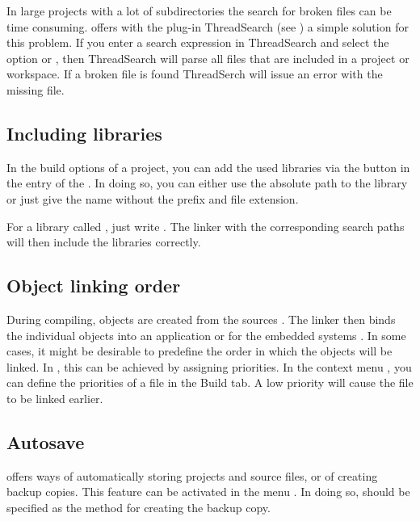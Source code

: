 In large projects with a lot of subdirectories the search for broken files can be time consuming. \codeblocks offers with the plug-in ThreadSearch (see ) a simple solution for this problem. If you enter a search expression in ThreadSearch and select the option  or , then ThreadSearch will parse all files that are included in a project or workspace. If a broken file is found ThreadSerch will issue an error with the missing file.

\subsection{Including libraries}

In the build options of a project, you can add the used libraries via the  button in the  entry of the . In doing so, you can either use the absolute path to the library or just give the name without the  prefix and file extension.


For a library called , just write . The linker with the corresponding search paths will then include the libraries correctly.


\subsection{Object linking order}

During compiling, objects  are created from the sources . The linker then binds the individual objects into an application  or for the embedded systems . In some cases, it might be desirable to predefine the order in which the objects will be linked. In \codeblocks, this can be achieved by assigning priorities. In the context menu , you can define the priorities of a file in the Build tab. A low priority will cause the file to be linked earlier.

\subsection{Autosave}

\codeblocks offers ways of automatically storing projects and source files, or of creating backup copies. This feature can be activated in the menu . In doing so,  should be specified as the method for creating the backup copy.

